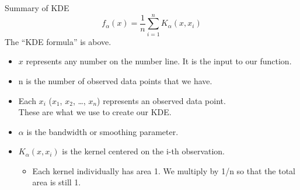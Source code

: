 \documentclass[aspectratio=169]{../latex_main/tntbeamer}  %
\begin{document}
	
	\begin{frame}{Summary of KDE}
	    \begin{equation*}
	        f_\alpha (x) = \frac{1}{n}\sum_{i=1}^n K_\alpha (x,x_i)
	    \end{equation*}
	    The “KDE formula” is above.
	    \begin{itemize}
	        \item $x$ represents any number on the number line. It is the input to our function.
	        \item n is the number of observed data points that we have.
	        \item Each $x_i$ ($x_1$, $x_2$, …, $x_n$) represents an observed data point.\\ These are what we use to create our KDE.
	        \item $\alpha$ is the bandwidth or smoothing parameter.
	        \item $K_\alpha(x, x_i)$ is the kernel centered on the i-th observation. 
            \begin{itemize}
                \item Each kernel individually has area 1. We multiply by 1/n so that the total area is still 1.
            \end{itemize}
	    \end{itemize}
	\end{frame}
	
	
	
\end{document}
